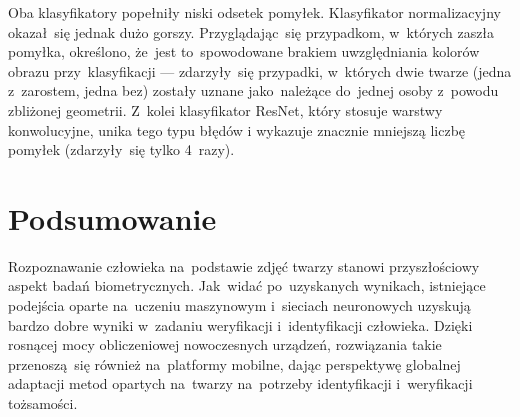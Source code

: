 \documentclass[11pt,a4paper]{article}
\begin{document}
Oba klasyfikatory popełniły niski odsetek pomyłek.
Klasyfikator normalizacyjny okazał~się jednak dużo gorszy.
Przyglądając~się przypadkom, w~których zaszła pomyłka, określono, że~jest to~spowodowane brakiem uwzględniania kolorów obrazu przy~klasyfikacji --- zdarzyły~się przypadki, w~których dwie twarze (jedna z~zarostem, jedna bez) zostały uznane jako~należące do~jednej osoby z~powodu zbliżonej geometrii.
Z~kolei klasyfikator ResNet, który stosuje warstwy konwolucyjne, unika tego typu błędów i wykazuje znacznie mniejszą liczbę pomyłek (zdarzyły~się tylko 4~razy).

\section{Podsumowanie}

Rozpoznawanie człowieka na~podstawie zdjęć twarzy stanowi przyszłościowy aspekt badań biometrycznych.
Jak~widać po~uzyskanych wynikach, istniejące podejścia oparte na~uczeniu maszynowym i~sieciach neuronowych uzyskują bardzo dobre wyniki w~zadaniu weryfikacji i~identyfikacji człowieka.
Dzięki rosnącej mocy obliczeniowej nowoczesnych urządzeń, rozwiązania takie przenoszą~się również na~platformy mobilne, dając perspektywę globalnej adaptacji metod opartych na~twarzy na~potrzeby identyfikacji i~weryfikacji tożsamości.
\end{document}
